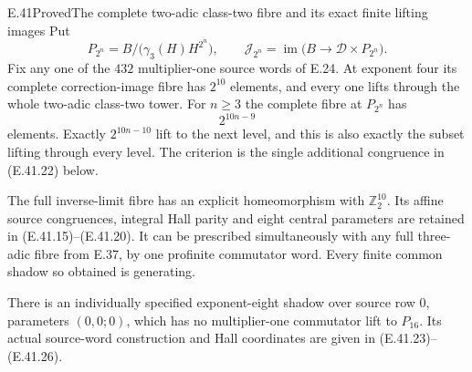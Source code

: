 \begin{statement}{E.41}{Proved}{The complete two-adic class-two fibre and its exact finite lifting images}
Put
\[
 P_{2^n}=B/\bigl(\gamma_3(H)H^{2^n}\bigr),\qquad
 \mathscr J_{2^n}=\operatorname{im}
       \bigl(B\longrightarrow\mathscr D\times P_{2^n}\bigr).
 \tag{E.41.1}
\]
Fix any one of the $432$ multiplier-one source words
of E.24.  At exponent four its complete correction-image
fibre has $2^{10}$ elements, and every one lifts through
the whole two-adic class-two tower.  For $n\ge3$ the
complete fibre at $P_{2^n}$ has
\[
                 2^{10n-9}
 \tag{E.41.2}
\]
elements.  Exactly $2^{10n-10}$ lift to the next level,
and this is also exactly the subset lifting through
every level.  The criterion is the single additional
congruence in \textup{(E.41.22)} below.

The full inverse-limit fibre has an explicit
homeomorphism with $\mathbb Z_2^{10}$.
Its affine source congruences, integral Hall parity
and eight central parameters are retained in
\textup{(E.41.15)--(E.41.20)}.
It can be prescribed simultaneously with any full
three-adic fibre from E.37, by one profinite
commutator word.  Every finite common shadow so
obtained is generating.

There is an individually specified exponent-eight
shadow over source row $0$, parameters $(0,0;0)$,
which has no multiplier-one commutator lift to
$P_{16}$.  Its actual source-word construction and
Hall coordinates are given in
\textup{(E.41.23)--(E.41.26)}.
\end{statement}
